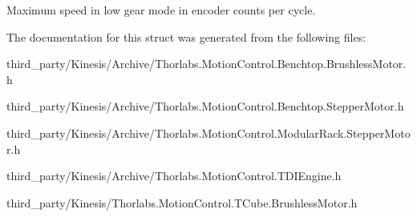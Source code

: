 Maximum speed in low gear mode in encoder counts per cycle. 



The documentation for this struct was generated from the following files\+:\begin{DoxyCompactItemize}
\item 
third\+\_\+party/\+Kinesis/\+Archive/Thorlabs.\+Motion\+Control.\+Benchtop.\+Brushless\+Motor.\+h\item 
third\+\_\+party/\+Kinesis/\+Archive/Thorlabs.\+Motion\+Control.\+Benchtop.\+Stepper\+Motor.\+h\item 
third\+\_\+party/\+Kinesis/\+Archive/Thorlabs.\+Motion\+Control.\+Modular\+Rack.\+Stepper\+Motor.\+h\item 
third\+\_\+party/\+Kinesis/\+Archive/Thorlabs.\+Motion\+Control.\+T\+D\+I\+Engine.\+h\item 
third\+\_\+party/\+Kinesis/Thorlabs.\+Motion\+Control.\+T\+Cube.\+Brushless\+Motor.\+h\end{DoxyCompactItemize}
